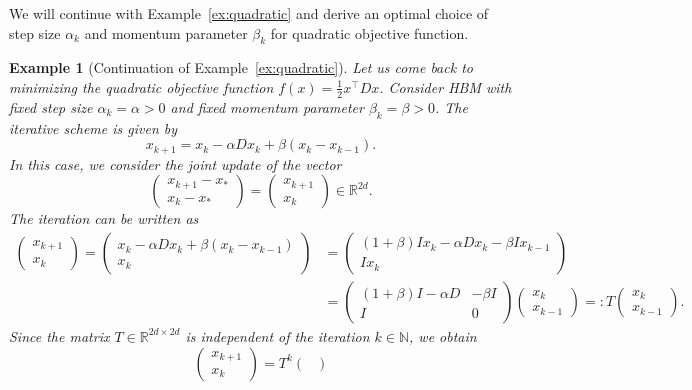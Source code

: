 \documentclass[12pt,openany]{book}
\newtheorem{example}[thm]{Example}
\theoremstyle{definition}
\theoremstyle{definition}
\newcommand{\N}{\mathbb{N}}
\newcommand{\R}{\mathbb{R}}
\begin{document}
We will continue with Example~\ref{ex:quadratic} and derive an optimal choice of step size $\alpha_k$ and momentum parameter $\beta_k$ for quadratic objective function.
\begin{example}[Continuation of Example~\ref{ex:quadratic}] \label{ex:quadratic_HBM}
Let us come back to minimizing the quadratic objective function $f(x) = \frac{1}{2}x^\top D x$. Consider HBM with fixed step size $\alpha_k=\alpha>0$ and fixed momentum parameter $\beta_k=\beta>0$. The iterative scheme is given by
\[x_{k+1} = x_k - \alpha D x_k + \beta (x_k-x_{k-1}). \]
In this case, we consider the joint update of the vector 
\[\begin{pmatrix}
x_{k+1}-x_\ast \\ x_k-x_\ast
\end{pmatrix} = \begin{pmatrix}
x_{k+1} \\ x_k
\end{pmatrix}\in\R^{2d} .\]
The iteration can be written as
\begin{align*}
 \begin{pmatrix}
x_{k+1} \\ x_k
\end{pmatrix} = \begin{pmatrix}
x_k-\alpha Dx_k + \beta (x_k-x_{k-1})\\ x_k
\end{pmatrix} &= \begin{pmatrix}
(1+\beta) I x_k -\alpha D x_k -\beta I x_{k-1}\\
I x_k
\end{pmatrix} \\ &= \begin{pmatrix}
(1+\beta)I -\alpha D & -\beta I\\ I & 0 
\end{pmatrix} \begin{pmatrix}
x_k\\x_{k-1}
\end{pmatrix} =: T \begin{pmatrix}
x_k\\x_{k-1}
\end{pmatrix}. 
\end{align*}
Since the matrix $T\in\R^{2d\times 2d}$ is independent of the iteration $k\in\N$, we obtain
\[ \begin{pmatrix}
x_{k+1} \\ x_k
\end{pmatrix} = T^k \begin{pmatrix}

\end{pmatrix}\]
\end{example}
\end{document}
